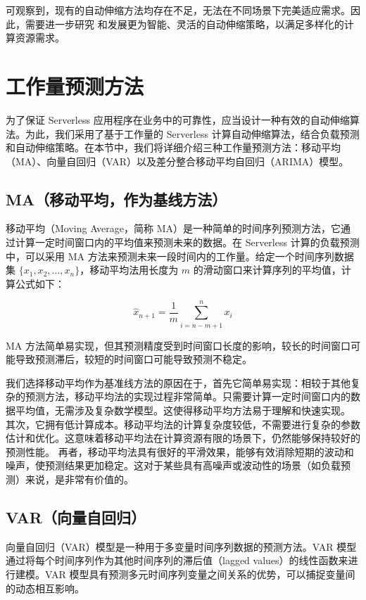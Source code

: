 \documentclass[a4paper,AutoFakeBold,oneside,12pt]{book}
\begin{document}
可观察到，现有的自动伸缩方法均存在不足，无法在不同场景下完美适应需求。因此，需要进一步研究
和发展更为智能、灵活的自动伸缩策略，以满足多样化的计算资源需求。


\section{工作量预测方法}

为了保证 Serverless 应用程序在业务中的可靠性，应当设计一种有效的自动伸缩算法。为此，我们采用了基于工作量的 Serverless 计算自动伸缩算法，结合负载预测和自动伸缩策略。在本节中，我们将详细介绍三种工作量预测方法：移动平均（MA）、向量自回归（VAR）以及差分整合移动平均自回归（ARIMA）模型。

\subsection{MA（移动平均，作为基线方法）}

移动平均（Moving Average，简称 MA）是一种简单的时间序列预测方法，它通过计算一定时间窗口内的平均值来预测未来的数据。在 Serverless 计算的负载预测中，可以采用 MA 方法来预测未来一段时间内的工作量。给定一个时间序列数据集 $\{x_1, x_2, \ldots, x_n\}$，移动平均法用长度为 $m$ 的滑动窗口来计算序列的平均值，计算公式如下：

\begin{equation}
\hat{x}_{n+1} = \frac{1}{m}\sum_{i=n-m+1}^{n}x_i
\end{equation}

MA 方法简单易实现，但其预测精度受到时间窗口长度的影响，较长的时间窗口可能导致预测滞后，较短的时间窗口可能导致预测不稳定。

我们选择移动平均作为基准线方法的原因在于，首先它简单易实现：相较于其他复杂的预测方法，移动平均法的实现过程非常简单。只需要计算一定时间窗口内的数据平均值，无需涉及复杂数学模型。这使得移动平均方法易于理解和快速实现。
其次，它拥有低计算成本。移动平均法的计算复杂度较低，不需要进行复杂的参数估计和优化。这意味着移动平均法在计算资源有限的场景下，仍然能够保持较好的预测性能。
再者，移动平均法具有很好的平滑效果，能够有效消除短期的波动和噪声，使预测结果更加稳定。这对于某些具有高噪声或波动性的场景（如负载预测）来说，是非常有价值的。

\subsection{VAR（向量自回归）}

向量自回归（VAR）模型是一种用于多变量时间序列数据的预测方法。VAR 模型通过将每个时间序列作为其他时间序列的滞后值（lagged values）的线性函数来进行建模。VAR 模型具有预测多元时间序列变量之间关系的优势，可以捕捉变量间的动态相互影响。
\end{document}
